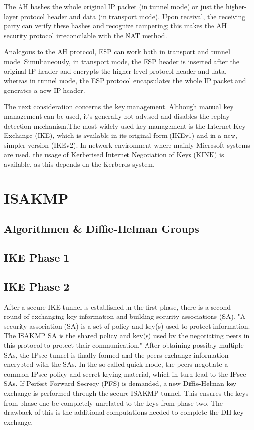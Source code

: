 \documentclass[a4paper]{report}
\begin{document}
The AH hashes the whole original IP packet (in tunnel mode) or just the higher-layer protocol header and data (in transport mode). Upon receival, the receiving party can verify these hashes and recognize tampering; this makes the AH security protocol irreconcilable with the NAT method. \parencite[2-11]{Kent2005AH}

Analogous to the AH protocol, ESP can work both in transport and tunnel mode. Simultaneously, in transport mode, the ESP header is inserted after the original IP header and encrypts the higher-level protocol header and data, whereas in tunnel mode, the ESP protocol encapsulates the whole IP packet and generates a new IP header. \parencite[18-20]{Kent2005ESP}

The next consideration concerns the key management. Although manual key management can be used, it's generally not advised and disables the replay detection mechanism.The most widely used key management is the Internet Key Exchange (IKE), which is available in its original form (IKEv1) and in a new, simpler version (IKEv2). In network environment where mainly Microsoft systems are used, the usage of Kerberised Internet Negotiation of Keys (KINK) is available, as this depends on the Kerberos system. \parencite[4-5]{Bellovin2009}

\section{ISAKMP}
\label{sec:ISAKMP}

\subsection{Algorithmen \& Diffie-Helman Groups}
\label{ssec:AlgoDH}

\subsection{IKE Phase 1}
\label{ssec:Phase1}

\subsection{IKE Phase 2}
\label{ssec:Phase2}
After a secure IKE tunnel is established in the first phase, there is a second round of exchanging key information and building security associations (SA). "A security association (SA) is a set of policy and key(s) used to protect information. The ISAKMP SA is the shared policy and key(s) used by the negotiating peers in this protocol to protect their communication." \parencite{Harkins1998} After obtaining possibly multiple SAs, the IPsec tunnel is finally formed and the peers exchange information encrypted with the SAs. In the so called quick mode, the peers negotiate a common IPsec policy and secret keying material, which in turn lead to the IPsec SAs. If Perfect Forward Secrecy (PFS) is demanded, a new Diffie-Helman key exchange is performed through the secure ISAKMP tunnel. This ensures the keys from phase one be completely unrelated to the keys from phase two. The drawback of this is the additional computations needed to complete the DH key exchange.
\end{document}
